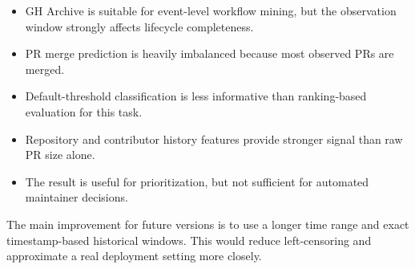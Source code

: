 \begin{itemize}
    \item GH Archive is suitable for event-level workflow mining, but the observation window strongly affects
        lifecycle completeness.
    \item PR merge prediction is heavily imbalanced because most observed PRs are merged.
    \item Default-threshold classification is less informative than ranking-based evaluation for this task.
    \item Repository and contributor history features provide stronger signal than raw PR size alone.
    \item The result is useful for prioritization, but not sufficient for automated maintainer decisions.
\end{itemize}

The main improvement for future versions is to use a longer time range and exact timestamp-based historical
windows. This would reduce left-censoring and approximate a real deployment setting more closely.
